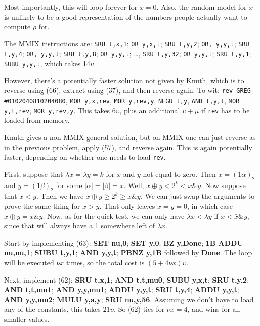 \vskip 0.08in  Most importantly, this will loop
forever for $x=0$.  Also, the random model for $x$ is unlikely to
be a good representation of the numbers people actually want to
compute $\rho$ for.

\vskip 0.08in  The MMIX instructions are:
{\tt SRU t,x,1}; {\tt OR y,x,t}; {\tt SRU t,y,2}; {\tt OR, y,y,t}; {\tt SRU t,y,4};
{\tt OR, y,y,t}; {\tt SRU t,y,8}; {\tt OR y,y,t}; \dots, {\tt SRU t,y,32};
{\tt OR y,y,t}; {\tt SRU t,y,1}; {\tt SUBU y,y,t}, which takes 14$\upsilon$.

However, there's a potentially faster solution not given by Knuth, which
is to reverse using (66), extract using (37), and then reverse again.
To wit: {\tt rev GREG \#0102040810204080}, {\tt MOR y,x,rev},
{\tt MOR y,rev,y}, {\tt NEGU t,y}, {\tt AND t,y,t}, {\tt MOR y,t,rev},
{\tt MOR y,rev,y}.  This takes 6$\upsilon$, plus an additional
$\upsilon + \mu$ if {\tt rev} has to be loaded from memory.

\vskip 0.08in  Knuth gives a non-MMIX
general solution, but on MMIX one can just reverse as in the
previous problem, apply (57), and reverse again.  This is again
potentially faster, depending on whether one needs to load {\tt rev}.

\vskip 0.08in  First, suppose that 
$\lambda x = \lambda y = k$ for $x$ and $y$ not equal to zero.
Then $x = \left(1 \alpha \right)_2$
and $y = \left(1 \beta \right)_2$ for some $| \alpha | = | \beta | = x$.
Well, $x \oplus y < 2^k < x \& y$.  Now suppose that $x < y$.
Then we have $x \oplus y \geq 2^k \ge x \& y$.  We can just swap
the arguments to prove the same thing for $x > y$.
That only leaves $x = y = 0$, in which case $x \oplus y = x \& y$.
Now, as for the quick test, we can only have $\lambda x < \lambda y$
if $x < \bar{x} \& y$, since that will always have a 1 somewhere
left of $\lambda x$.

\vskip 0.08in  Start by implementing (63): 
{\bf SET  nu,0}; {\bf SET  y,0}; {\bf BZ  y,Done}; {\bf 1B ADDU  nu,nu,1};
{\bf SUBU  t,y,1}; {\bf AND  y,y,t}; {\bf PBNZ  y,1B} followed by {\bf Done}.
The loop will be executed $\nu   x$ times, so the total cost is 
$\left(5 + 4 \nu   x \right) \upsilon$.

Next, implement (62): {\bf SRU  t,x,1}; {\bf AND  t,t,mu0}, {\bf SUBU  y,x,t};
{\bf SRU  t,y,2}; {\bf AND  t,t,mu1}; {\bf AND  y,y,mu1}; {\bf ADDU  y,y,t};
{\bf SRU  t,y,4}; {\bf ADDU  y,y,t}; {\bf AND  y,y,mu2}; {\bf MULU  y,a,y};
{\bf SRU  nu,y,56}.  Assuming we don't have to load any of the constants,
this takes $21\upsilon$.  So (62) ties for $\nu   x = 4$, and wins for all
smaller values.

